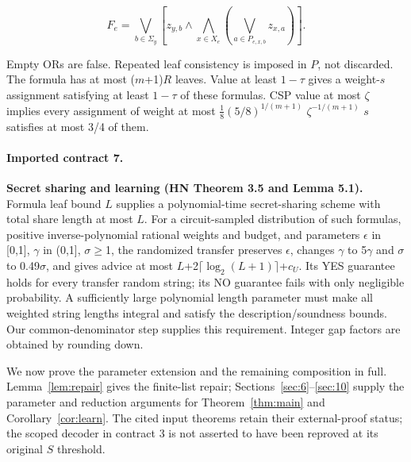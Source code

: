 \begin{equation}\label{eq:3}
F_e=\bigvee_{b\in\Sigma_y}\left[z_{y,b}\land\bigwedge_{x\in X_e}\left(\bigvee_{a\in P_{e,x,b}}z_{x,a}\right)\right].
\end{equation}

Empty ORs are false. Repeated leaf consistency is imposed in \(P\), not discarded. The formula has at most (\(m\)+1)\(R\) leaves. Value at least \(1-\tau\) gives a weight-\(s\) assignment satisfying at least \(1-\tau\) of these formulas. CSP value at most \(\zeta\) implies every assignment of weight at most \(\frac18(5/8)^{1/(m+1)}\) \(\zeta^{-1/(m+1)}\) \(s\) satisfies at most 3/4 of them.

\paragraph{Imported contract 7.} \textbf{Secret sharing and learning (HN Theorem 3.5 and Lemma 5.1).} Formula leaf bound \(L\) supplies a polynomial-time secret-sharing scheme with total share length at most \(L\). For a circuit-sampled distribution of such formulas, positive inverse-polynomial rational weights and budget, and parameters \(\epsilon\) in [0,1], \(\gamma\) in (0,1], \(\sigma\)\(\ge\)1, the randomized transfer preserves \(\epsilon\), changes \(\gamma\) to 5\(\gamma\) and \(\sigma\) to 0.49\(\sigma\), and gives advice at most \(L\)+2\(\lceil \log_2(L+1)\rceil\)+\(c_U\). Its YES guarantee holds for every transfer random string; its NO guarantee fails with only negligible probability. A sufficiently large polynomial length parameter must make all weighted string lengths integral and satisfy the description/soundness bounds. Our common-denominator step supplies this requirement. Integer gap factors are obtained by rounding down.

We now prove the parameter extension and the remaining composition in full. Lemma~\ref{lem:repair} gives the finite-list repair; Sections~\ref{sec:6}--\ref{sec:10} supply the parameter and reduction arguments for Theorem~\ref{thm:main} and Corollary~\ref{cor:learn}. The cited input theorems retain their external-proof status; the scoped decoder in contract 3 is not asserted to have been reproved at its original \(S\) threshold.


